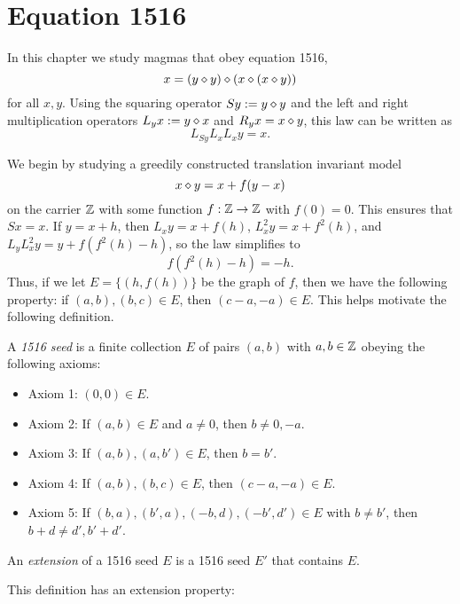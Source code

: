 \chapter{Equation 1516}\label{1516-chapter}

In this chapter we study magmas that obey equation 1516,
\begin{equation}\label{1516}
  x = (y \diamond y) \diamond (x \diamond (x \diamond y))
\end{equation}
for all $x,y$.  Using the squaring operator $Sy := y \diamond y$ and the left and right multiplication operators $L_y x := y \diamond x$ and $R_y x = x \diamond y$, this law can be written as
$$ L_{Sy} L_x L_x y = x.$$

We begin by studying a greedily constructed translation invariant model
\begin{equation}\label{xy-1516}
   x \diamond y = x+f(y-x)
\end{equation}
on the carrier $\mathbb{Z}$ with some function $f:\mathbb{Z} \to \mathbb{Z}$ with $f(0)=0$.  This ensures that $Sx = x$.  If $y = x+h$, then $L_x y = x + f(h)$, $L_x^2 y = x + f^2(h)$, and $L_y L_x^2 y = y + f(f^2(h)-h)$, so the law  simplifies to
\begin{equation}\label{1516-f}
   f(f^2(h)-h) = -h.
\end{equation}
Thus, if we let $E = \{ (h, f(h))\}$ be the graph of $f$, then we have the following property: if $(a,b), (b,c) \in E$, then $(c-a,-a) \in E$.  This helps motivate the following definition.

\begin{definition}[1516 seed]\label{1516-seed}  A \emph{1516 seed} is a finite collection $E$ of pairs $(a,b)$ with $a,b \in \mathbb{Z}$ obeying the following axioms:
  \begin{itemize}
  \item Axiom 1: $(0,0) \in E$.
  \item Axiom 2: If $(a,b) \in E$ and $a \neq 0$, then $b \neq 0, -a$.
  \item Axiom 3: If $(a,b), (a,b') \in E$, then $b=b'$.
  \item Axiom 4: If $(a,b), (b,c) \in E$, then $(c-a,-a) \in E$.
  \item Axiom 5: If $(b,a), (b',a), (-b, d), (-b',d') \in E$ with $b \neq b'$, then $b+d \neq d', b'+d'$.
  \end{itemize}
An \emph{extension} of a 1516 seed $E$ is a 1516 seed $E'$ that contains $E$.
\end{definition}

This definition has an extension property:

